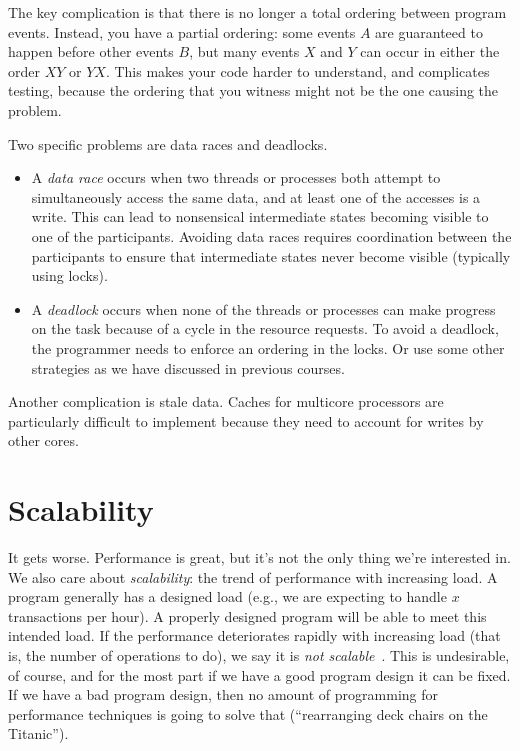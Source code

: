 The key complication is that there is no longer a total ordering between
program events. Instead, you have a partial ordering: some events $A$
are guaranteed to happen before other events $B$, but many events $X$ 
and $Y$ can occur in either the order $XY$ or $YX$. This makes your code
harder to understand, and complicates testing, because the ordering that
you witness might not be the one causing the problem.

Two specific problems are data races and deadlocks. 
\begin{itemize}
\item A
\emph{data race} occurs when two threads or processes both attempt to
simultaneously access the same data, and at least one of the accesses
is a write. This can lead to nonsensical intermediate states becoming
visible to one of the participants. Avoiding data races requires
coordination between the participants to ensure that intermediate
states never become visible (typically using locks). 
\item A \emph{deadlock}
occurs when none of the threads or processes can make progress on the
task because of a cycle in the resource requests. To avoid a deadlock,
the programmer needs to enforce an ordering in the locks. Or use some other strategies as we have discussed in previous courses.
\end{itemize}

Another complication is stale data. Caches for multicore processors
are particularly difficult to implement because they need to account
for writes by other cores.

\section*{Scalability}

It gets worse. Performance is great, but it's not the only thing we're interested in. We also care about \textit{scalability}: the trend of performance with increasing load. A program generally has a designed load (e.g., we are expecting to handle $x$ transactions per hour). A properly designed program will be able to meet this intended load. If the performance deteriorates rapidly with increasing load (that is, the number of operations to do), we say it is \textit{not scalable}~\cite{swps}. This is undesirable, of course, and for the most part if we have a good program design it can be fixed. If we have a bad program design, then no amount of programming for performance techniques is going to solve that (``rearranging deck chairs on the Titanic'').

